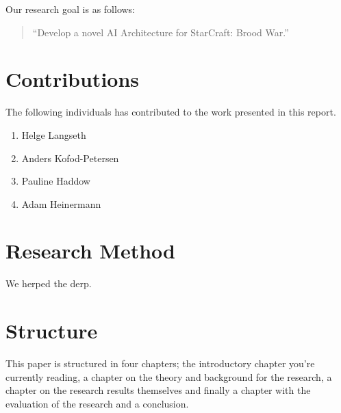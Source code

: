 Our research goal is as follows:
\begin{quote}
 ``Develop a novel AI Architecture for StarCraft: Brood War.''
\end{quote}


\section{Contributions}
The following individuals has contributed to the work presented in this report.

\begin{enumerate}
 \item Helge Langseth
 \item Anders Kofod-Petersen
 \item Pauline Haddow
 \item Adam Heinermann
\end{enumerate}


\section{Research Method}
We herped the derp.


\section{Structure}
This paper is structured in four chapters; the introductory chapter you're
currently reading, a chapter on the theory and background for the research, a
chapter on the research results themselves and finally a chapter with the
evaluation of the research and a conclusion.